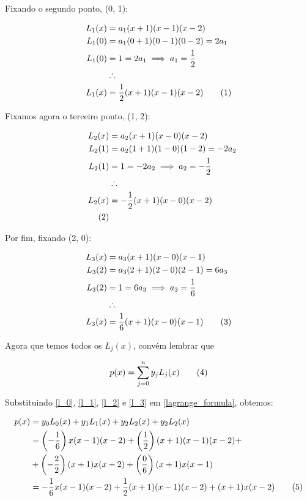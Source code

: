 \documentclass[9.5pt,reqno,a4paper]{amsart}
\newcommand\numberthis{\addtocounter{equation}{1}\tag{\theequation}}
\begin{document}
\bigskip
\bigskip
Fixando o segundo ponto, (0, 1):

\begin{align*}
    L_1(x) &= a_1(x+1)(x-1)(x-2)\\
    L_1(0) &= a_1(0+1)(0-1)(0-2) = 2a_1\\
    L_1(0) &= 1 = 2a_1 \implies a_1 = \frac{1}{2}\\
    &\therefore\\
    L_1(x) &= \frac{1}{2}(x+1)(x-1)(x-2) \numberthis \label{l_1}
\end{align*}

\bigskip
\bigskip
Fixamos agora o terceiro ponto, (1, 2):

\begin{align*}
    L_2(x) &= a_2(x+1)(x-0)(x-2)\\
    L_2(1) &= a_2(1+1)(1-0)(1-2) = -2a_2\\
    L_2(1) &= 1 = -2a_2 \implies a_2 = -\frac{1}{2}\\
    &\therefore\\
    L_2(x) &= -\frac{1}{2}(x+1)(x-0)(x-2)\\ \numberthis \label{l_2}
\end{align*}

\bigskip
\bigskip
Por fim, fixando (2, 0):

\begin{align*}
    L_3(x) &= a_3(x+1)(x-0)(x-1)\\
    L_3(2) &= a_3(2+1)(2-0)(2-1) = 6a_3\\
    L_3(2) &= 1 = 6a_3 \implies a_3 = \frac{1}{6}\\
    &\therefore\\
    L_3(x) &= \frac{1}{6}(x+1)(x-0)(x-1) \numberthis \label{l_3}
\end{align*}

\bigskip
\bigskip
Agora que temos todos os $L_j(x)$, convém lembrar que

\begin{equation}
    p(x) = \sum_{j=0}^{n} y_j L_j(x) \numberthis \label{lagrange_formula}
\end{equation}

\bigskip
\bigskip
Substituindo \eqref{l_0}, \eqref{l_1}, \eqref{l_2} e \eqref{l_3} em \eqref{lagrange_formula}, obtemos:

\begin{align*}
    p(x) &= y_0L_0(x) + y_1L_1(x) + y_2L_2(x) + y_2L_2(x)\\
         &= \left(-\frac{1}{6}\right)x(x-1)(x-2) + \left(\frac{1}{2}\right)(x+1)(x-1)(x-2) +\\
         & + \left(-\frac{2}{2}\right)(x+1)x(x-2) + \left(\frac{0}{6}\right)(x+1)x(x-1)\\
         &= -\frac{1}{6}x(x-1)(x-2) + \frac{1}{2}(x+1)(x-1)(x-2) + (x+1)x(x-2) \numberthis \label{compressed_lagrange}
\end{align*}
\end{document}
